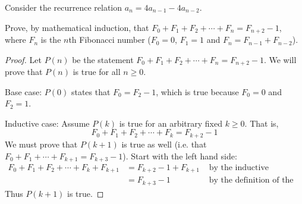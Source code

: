 \documentclass[11pt]{exam}
\begin{document}
\begin{questions}
\begin{parts}
\end{parts}


\question[5] Consider the recurrence relation $a_n = 4a_{n-1} - 4a_{n-2}$.

\question[5] Prove, by mathematical induction, that $F_0 + F_1 + F_2 + \cdots + F_{n} = F_{n+2} - 1$, where $F_n$ is the $n$th Fibonacci number ($F_0 = 0$, $F_1 = 1$ and $F_n = F_{n-1} + F_{n-2}$).
\begin{solution}
  \begin{proof}
    Let $P(n)$ be the statement $F_0 + F_1 + F_2 + \cdots + F_n = F_{n+2} - 1$.  We will prove that $P(n)$ is true for all $n \ge 0$.  
    
    Base case: $P(0)$ states that $F_0 = F_2 - 1$, which is true because $F_0 = 0$ and $F_2 = 1$.
    
    Inductive case:  Assume $P(k)$ is true for an arbitrary fixed $k \ge 0$.  That is, \[F_0 + F_1 + F_2 + \cdots + F_k = F_{k+2} - 1\]
    We must prove that $P(k+1)$ is true as well (i.e. that $F_0 + F_1 + \cdots +F_{k+1} = F_{k+3} - 1$).  Start with the left hand side:
    \begin{align*}
      F_0 + F_1 + F_2 + \cdots + F_k + F_{k+1} & = F_{k+2} - 1 + F_{k+1} & \mbox{ by the inductive hypothesis}\\
      & = F_{k+3} - 1 & \mbox{ by the definition of the Fibonacci numbers}
    \end{align*}
    Thus $P(k+1)$ is true.
    

\end{proof}
\end{solution}
\end{questions}
\end{document}
